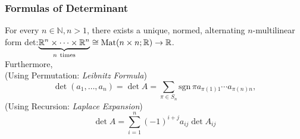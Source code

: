 \documentclass[12pt, t]{beamer}
\newcommand{\N}{\mathbb{N}}
\begin{document}
\begin{frame}
    \frametitle{Formulas of Determinant}
    For every $n\in\N,n>1$, there exists a unique, normed, alternating $n$-multilinear form det:$\underbrace{\mathbb{R}^n\times\cdots\times\mathbb{R}^n}_{n~\text{times}}\cong\text{Mat}(n\times n;\mathbb{R})\to\mathbb{R}$.\\[7pt]
    Furthermore,\\
    (Using Permutation:  \textit{Leibnitz Formula})
    \begin{equation}\label{1.7.17}
        \det(a_1,\ldots,a_n)=\det A=\sum_{\pi\in S_n}\text{sgn}\,\pi a_{\pi(1)1}\cdots a_{\pi(n)n},
    \end{equation}
    (Using Recursion:  \textit{Laplace Expansion})
    \begin{equation}\label{1.7.21}
        \det A=\sum_{i=1}^{n}(-1)^{i+j}a_{ij}\det A_{ij}
    \end{equation}
\end{frame}
\end{document}
